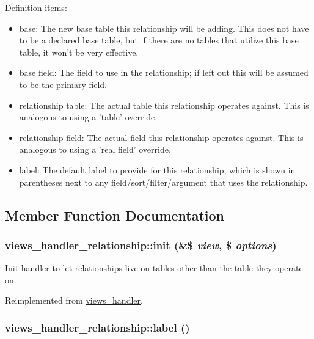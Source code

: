 Definition items:\begin{itemize}
\item base: The new base table this relationship will be adding. This does not have to be a declared base table, but if there are no tables that utilize this base table, it won't be very effective.\item base field: The field to use in the relationship; if left out this will be assumed to be the primary field.\item relationship table: The actual table this relationship operates against. This is analogous to using a 'table' override.\item relationship field: The actual field this relationship operates against. This is analogous to using a 'real field' override.\item label: The default label to provide for this relationship, which is shown in parentheses next to any field/sort/filter/argument that uses the relationship. \end{itemize}


\subsection{Member Function Documentation}
\hypertarget{classviews__handler__relationship_a50c5d9c6b52fa2eeed61e88a74bc083}{
\subsubsection[{init}]{\setlength{\rightskip}{0pt plus 5cm}views\_\-handler\_\-relationship::init (\&\$ {\em view}, \/  \$ {\em options})}}
\label{classviews__handler__relationship_a50c5d9c6b52fa2eeed61e88a74bc083}


Init handler to let relationships live on tables other than the table they operate on. 

Reimplemented from \hyperlink{classviews__handler_1f5f42ba46d3584280788fda97eee8c5}{views\_\-handler}.\hypertarget{classviews__handler__relationship_f39d860cac5cd67836901304a08b43a0}{
\subsubsection[{label}]{\setlength{\rightskip}{0pt plus 5cm}views\_\-handler\_\-relationship::label ()}}
\label{classviews__handler__relationship_f39d860cac5cd67836901304a08b43a0}


